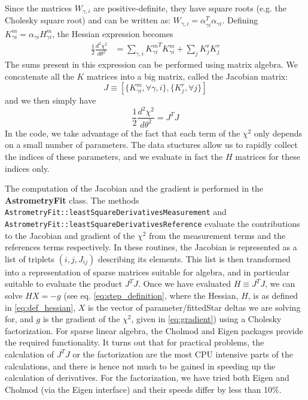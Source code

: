 \documentclass[a4paper,12pt]{scrartcl}
\newcommand{\ClName}[1]{{\bf #1}}
\newcommand{\RoutineName}[1]{\texttt{#1}}
\def\bf{\normalfont\bfseries}
\begin{document}
Since the matrices $W_{\gamma,i}$ are positive-definite, they have
square roots (e.g. the Cholesky square root) and can be written as:
$W_{\gamma,i} = \alpha^T_{\gamma i} \alpha_{\gamma i}$. Defining
$K^m_{\gamma i} = \alpha_{\gamma i} H^m_{\gamma i}$, the Hessian
expression becomes
\begin{align}
\frac{1}{2} \frac{d^2 \chi^2}{d \theta^2} & =  \sum_{\gamma,i}  {K^m_{\gamma i}}^T K^m_{\gamma i} +\sum_j {K^r_{j}} K^r_{j} %
\end{align}
The sums present in this expression can be performed using
matrix algebra. We concatenate all the $K$ matrices into a big
matrix, called the Jacobian matrix:
$$
J \equiv \left[\{K^m_{\gamma i}, \forall \gamma, i\}, \{ K^r_{j}, \forall j\} \right]
$$
and we then simply have
$$
\frac{1}{2} \frac{d^2 \chi^2}{d \theta^2} = J^T J
$$
In the code, we take advantage of the fact that each term of the
$\chi^2$ only depends on a small number of parameters. The data
stuctures allow us to rapidly collect the indices of these parameters,
and we evaluate in fact the $H$ matrices for these indices only.

The computation of the Jacobian and the gradient is performed in
the \ClName{AstrometryFit} class. The methods
\RoutineName{AstrometryFit::leastSquareDerivativesMeasurement} and \\
\RoutineName{AstrometryFit::leastSquareDerivativesReference} evaluate the contributions to
the Jacobian and gradient of the $\chi^2$ from the measurement terms
and the references terms respectively. In these routines, the Jacobian
is represented as a list of triplets $(i,j,J_{ij})$ describing its
elements. This list is then transformed into a representation of
sparse matrices suitable for algebra, and in particular suitable to
evaluate the product $J^TJ$. Once we have evaluated $H\equiv J^TJ$, we
can solve $HX=-g$ (see eq. \ref{eq:step_definition}, where the Hessian, $H$, is as
defined in \ref{eq:def_hessian}, $X$ is the vector of parameter/fittedStar deltas
we are solving for, and $g$ is the gradient of the $\chi^2$, given in \ref{eq:gradient})
using a Cholesky factorization. For sparse linear
algebra, the Cholmod and Eigen packages provide the required
functionality. It turns out that for practical problems, the
calculation of $J^TJ$ or the factorization are the most CPU intensive
parts of the calculations, and
there is hence not much to be gained in speeding up the calculation of
derivatives. For the factorization, we have tried both Eigen and
Cholmod (via the Eigen interface) and their speeds differ by less
than 10\%.
\end{document}
